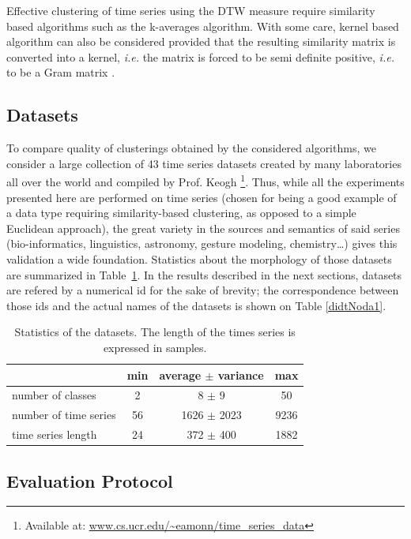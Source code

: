 \documentclass[natbib,smallextended]{svjour3}
\begin{document}
Effective clustering of time series using the DTW measure require similarity based algorithms such as the k-averages algorithm. With some care, kernel based algorithm can also be considered provided that the resulting similarity matrix is converted into a kernel, \textit{i.e.} the matrix is forced to be semi definite positive, \textit{i.e.} to be a Gram matrix \citep{Lanckriet:2004:LKM:1005332.1005334}.

\subsection{Datasets}

To compare quality of clusterings obtained by the considered algorithms, we consider a large collection of 43 time series datasets created by many laboratories all over the world and compiled by Prof. Keogh \footnote{Available at: \url{www.cs.ucr.edu/~eamonn/time_series_data}}. Thus, while all the experiments presented here are performed on time series (chosen for being a good example of a data type requiring similarity-based clustering, as opposed to a simple Euclidean approach), the great variety in the sources and semantics of said series (bio-informatics, linguistics, astronomy, gesture modeling, chemistry\ldots{}) gives this validation a wide foundation. Statistics about the morphology of those datasets are summarized in Table~\ref{tab:dbs}.
In the results described in the next sections, datasets are refered by a numerical id for the sake of brevity; the correspondence between those ids and the actual names of the datasets is shown on Table \ref{didtNoda1}.

\begin{table}
\center
\caption{\label{tab:dbs} Statistics of the datasets. The length of the times series is expressed in samples.}
\begin{tabular}{l|ccc}
& min & average $\pm$ variance & max \\
\hline
number of classes & 2 & 8 $\pm$ 9 & 50 \\
number of time series & 56 & 1626 $\pm$ 2023 & 9236 \\
time series length & 24 & 372 $\pm$ 400 & 1882 \\
\end{tabular}
\end{table}

\subsection{Evaluation Protocol}
\end{document}
